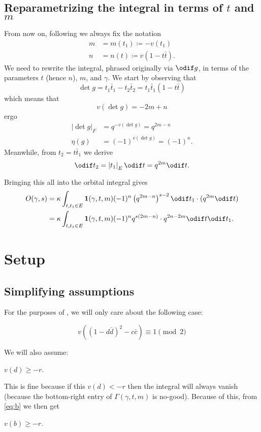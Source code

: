 \subsection{Reparametrizing the integral in terms of $t$ and $m$}
From now on, following \cite{ref:AFL} we always fix the notation
\begin{align*}
  m &= m(t_1) \coloneqq -v(t_1) \\
  n &= n(t) \coloneqq v(1-t\bar t).
\end{align*}
We need to rewrite the integral, phrased originally via $\odif g$,
in terms of the parameters $t$ (hence $n$), $m$, and $\gamma$.
We start by observing that
\[ \det g = t_1 \bar t_1 - t_2 \bar t_2 = t_1 \bar t_1 (1 - t\bar t) \]
which means that
\[ v(\det g) = -2m + n \]
ergo
\begin{align*}
  \left\lvert \det g \right\rvert_F &= q^{-v(\det g)} = q^{2m-n} \\
  \eta(g) &= (-1)^{v(\det g)} = (-1)^n.
\end{align*}
Meanwhile, from $t_2 = t \bar t_1$ we derive
\[ \odif t_2 = \left\lvert t_1 \right\rvert_E \odif t = q^{2m} \odif t. \]

Bringing this all into the orbital integral gives
\begin{align*}
  O(\gamma, s) &= \kappa \int_{t, t_1 \in E} \mathbf{1}(\gamma, t, m)
  (-1)^n \left( q^{2m-n} \right)^{s-2} \odif t_1 \cdot (q^{2m} \odif t) \\
  &= \kappa \int_{t, t_1 \in E} \mathbf{1}(\gamma, t, m)
  (-1)^n q^{s(2m-n)} \cdot q^{2n-2m} \odif t \odif t_1.
\end{align*}

\section{Setup}
\subsection{Simplifying assumptions}
For the purposes of \cite{ref:AFL},
we will only care about the following case:
\begin{assume}
  \[ v\left( (1-d\bar d)^2 - c \bar c\right) \equiv 1 \pmod 2 \]
  \label{assume:implies_delta}
\end{assume}
We will also assume:
\begin{assume}
  $v(d) \geq -r$.
\end{assume}
This is fine because if this $v(d) < -r$ then the integral will always vanish
(because the bottom-right entry of $\Gamma(\gamma, t, m)$ is no-good).
Because of this, from \eqref{eq:b} we then get
\begin{corollary}
  $v(b) \geq -r$.
\end{corollary}

